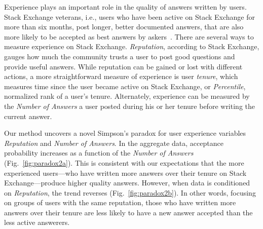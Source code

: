 Experience plays an important role in the quality of answers written by users. Stack Exchange veterans, i.e., users who have been active on Stack Exchange for more than six months, post longer, better documented answers, that are also more likely to be accepted as best answers by askers~\cite{Ferrara2017dynamics}. There are several ways to measure experience on Stack Exchange. \textit{Reputation}, according to Stack Exchange, gauges how much the community trusts a user to post good questions and provide useful answers. While reputation can be gained or lost with different actions, a more straightforward measure of experience is user \textit{tenure}, which measures time since the user became active on Stack Exchange, or \textit{Percentile}, normalized rank of a user's tenure.
Alternately, experience can be measured by the \textit{Number of Answers} a user posted during his or her tenure before writing the current answer.

Our method uncovers a novel Simpson's paradox for user experience variables \textit{Reputation} and \textit{Number of Answers}. In the aggregate data, acceptance probability increases as a function of the \emph{Number of Answers} (Fig.~\ref{fig:paradox2a}). This is consistent with our expectations that the more experienced users---who have written more answers over their tenure on Stack Exchange---produce higher quality answers. However, when data is conditioned on \emph{Reputation}, the trend reverses (Fig.~\ref{fig:paradox2b}). In other words, focusing on groups of users with the same reputation, those who have written more answers over their tenure are less likely to have a new answer accepted than the less active answerers.





%
%
%

